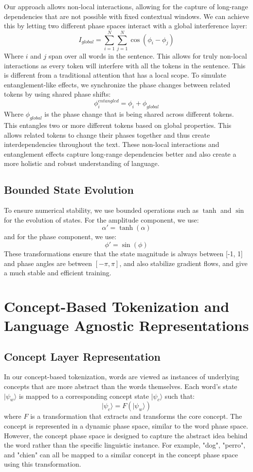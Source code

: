 \documentclass[11pt, a4paper]{article}
\begin{document}
Our approach allows non-local interactions, allowing for the capture of long-range dependencies that are not possible with fixed contextual windows. We can achieve this by letting two different phase spaces interact with a global interference layer:
$$
I_{global} =  \sum_{i=1}^{N} \sum_{j=1}^{N} \cos(\phi_i - \phi_j)
$$
Where $i$ and $j$ span over all words in the sentence. This allows for truly non-local interactions as every token will interfere with all the tokens in the sentence. This is different from a traditional attention that has a local scope.
To simulate entanglement-like effects, we synchronize the phase changes between related tokens by using shared phase shifts:
$$
\phi_{i}^{entangled} =  \phi_{i} + \phi_{global}
$$
Where $\phi_{global}$ is the phase change that is being shared across different tokens. This entangles two or more different tokens based on global properties. This allows related tokens to change their phases together and thus create interdependencies throughout the text. These non-local interactions and entanglement effects capture long-range dependencies better and also create a more holistic and robust understanding of language.

\subsection{Bounded State Evolution}

To ensure numerical stability, we use bounded operations such as $\tanh$ and $\sin$ for the evolution of states. For the amplitude component, we use:
$$
\alpha' = \tanh(\alpha)
$$
and for the phase component, we use:
$$
\phi' = \sin(\phi)
$$
These transformations ensure that the state magnitude is always between [-1, 1] and phase angles are between $[-\pi, \pi]$, and also stabilize gradient flows, and give a much stable and efficient training.

\section{Concept-Based Tokenization and Language Agnostic Representations}

\subsection{Concept Layer Representation}

In our concept-based tokenization, words are viewed as instances of underlying concepts that are more abstract than the words themselves. Each word’s state $|\psi_w\rangle$ is mapped to a corresponding concept state $|\psi_c\rangle$ such that:
$$
|\psi_c\rangle = F(|\psi_w\rangle)
$$
where $F$ is a transformation that extracts and transforms the core concept. The concept is represented in a dynamic phase space, similar to the word phase space. However, the concept phase space is designed to capture the abstract idea behind the word rather than the specific linguistic instance. For example, "dog", "perro", and "chien" can all be mapped to a similar concept in the concept phase space using this transformation.
\end{document}
